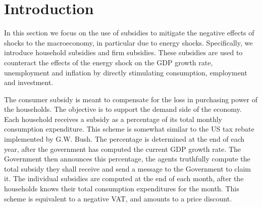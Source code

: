 \begin{comment}
\documentclass[a4paper,11pt]{article}
\usepackage{amsfonts}
\usepackage{amssymb}
\usepackage{amsmath}
\usepackage{euscript}
\usepackage{boxedminipage}
\usepackage{lscape}
\usepackage{minitoc}
\usepackage{epsfig,psfrag,graphicx,verbatim}
\usepackage{url,natbib}

\vfuzz2pt %
\hfuzz2pt %

\setlength{\oddsidemargin}{0cm}
\setlength{\evensidemargin}{0cm}
\setlength{\textwidth}{16cm}
\setlength{\textheight}{23cm}



\title{Macroeconomic stabilization policies to mitigate the effects of
adverse economic conditions, in particular of energy shocks}
\author{Christophe Deissenberg and Sander van der Hoog}
\date{\today}
\maketitle
\tableofcontents
\end{comment}

\section{Introduction}

In this section we focus on the use of subsidies to mitigate the negative
effects of shocks to the macroeconomy, in particular due to energy shocks.
Specifically, we introduce household subsidies and firm subsidies. These
subsidies are used to counteract the effects of the energy shock on the GDP
growth rate, unemployment and inflation by directly stimulating consumption,
employment and investment.

\bigskip The consumer subsidy is meant to compensate for the loss in
purchasing power of the households. The objective is to support the demand
side of the economy. Each household receives a subsidy as a percentage of
its total monthly consumption expenditure. This scheme is somewhat similar
to the US tax rebate implemented by G.W. Bush. The percentage is determined
at the end of each year, after the government has computed the current GDP
growth rate. The Government then announces this percentage, the agents
truthfully compute the total subsidy they shall receive and send a message
to the Government to claim it. The individual subsidies are computed at the
end of each month, after the households knows their total consumption
expenditures for the month. This scheme is equivalent to a negative VAT, and
amounts to a price discount.

